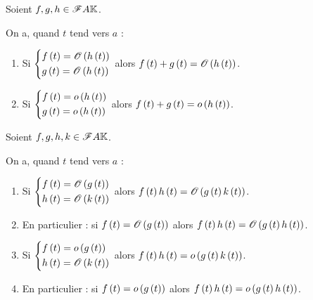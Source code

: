 \begin{prop}[Sommes]
Soient \(f,g,h\in\mathscr{F}{A}{\mathbb{K}}\).

On a, quand \(t\) tend vers \(a\) :

\begin{enumerate}
    \item Si \(\begin{dcases}
        f\left(t\right)=\mathscr{O}\left(h\left(t\right)\right) \\
        g\left(t\right)=\mathscr{O}\left(h\left(t\right)\right)
    \end{dcases}\) alors \(f\left(t\right)+g\left(t\right)=\mathscr{O}\left(h\left(t\right)\right)\). \\
    \item Si \(\begin{dcases}
        f\left(t\right)=o\left(h\left(t\right)\right) \\
        g\left(t\right)=o\left(h\left(t\right)\right)
    \end{dcases}\) alors \(f\left(t\right)+g\left(t\right)=o\left(h\left(t\right)\right)\).
\end{enumerate}
\end{prop}

\begin{prop}[Produits]
Soient \(f,g,h,k\in\mathscr{F}{A}{\mathbb{K}}\).

On a, quand \(t\) tend vers \(a\) :

\begin{enumerate}
    \item Si \(\begin{dcases}
        f\left(t\right)=\mathscr{O}\left(g\left(t\right)\right) \\
        h\left(t\right)=\mathscr{O}\left(k\left(t\right)\right)
    \end{dcases}\) alors \(f\left(t\right)h\left(t\right)=\mathscr{O}\left(g\left(t\right)k\left(t\right)\right)\). \\
    \item En particulier : si \(f\left(t\right)=\mathscr{O}\left(g\left(t\right)\right)\) alors \(f\left(t\right)h\left(t\right)=\mathscr{O}\left(g\left(t\right)h\left(t\right)\right)\). \\
    \item Si \(\begin{dcases}
        f\left(t\right)=o\left(g\left(t\right)\right) \\
        h\left(t\right)=\mathscr{O}\left(k\left(t\right)\right)
    \end{dcases}\) alors \(f\left(t\right)h\left(t\right)=o\left(g\left(t\right)k\left(t\right)\right)\). \\
    \item En particulier : si \(f\left(t\right)=o\left(g\left(t\right)\right)\) alors \(f\left(t\right)h\left(t\right)=o\left(g\left(t\right)h\left(t\right)\right)\).
\end{enumerate}
\end{prop}

